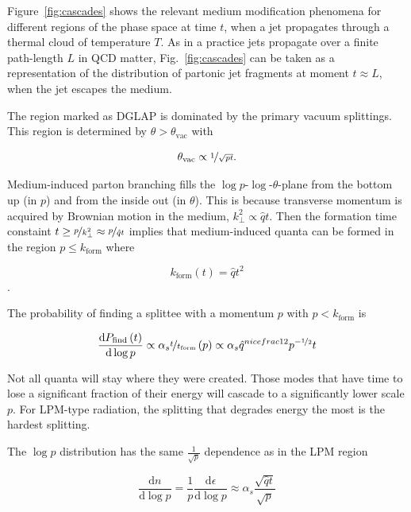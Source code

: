 Figure~\ref{fig:cascades} shows the relevant medium modification phenomena for different regions of the phase space at time $t$, when a jet propagates through a thermal cloud of temperature $T$. As in a practice jets propagate over a finite path-length $L$ in QCD matter, Fig.~\ref{fig:cascades} can be taken as a representation of the distribution of partonic jet fragments at moment $t \approx L$, when the jet escapes the medium.

The region marked as DGLAP is dominated by the primary vacuum splittings. This region is determined by $\theta > \theta_\mathrm{vac}$ with

\begin{equation}
\theta_\mathrm{vac} \propto \nicefrac{1}{\sqrt{pt}}.
\end{equation}


Medium-induced parton branching fills the $\log p$-$\log$-$\theta$-plane from the bottom up (in $p$) and from the inside out (in $\theta$). This is because transverse momentum is acquired by Brownian motion in the medium, $k_\perp^2 \propto \hat q t$. Then the formation time constaint $t \geq \nicefrac{p}{k_\perp^2} \approx \nicefrac{p}{\hat q t}$ implies that medium-induced quanta can be formed in the region $p \leq k_\mathrm{form}$ where

$$k_\mathrm{form}\left(t\right) = \hat q t^2$$.

The probability of finding a splittee with a momentum $p$ with $p < k_\mathrm{form}$ is 

\begin{equation}
\frac{\mathrm d P_\mathrm{find}\left(t\right)}{\mathrm d \log p} \propto \alpha_s \nicefrac{t}{t_\mathrm{form}}\left(p\right) \propto \alpha_s \hat q ^{nicefrac{1}{2}} p^{-\nicefrac{1}{2}} t
\end{equation} 

Not all quanta will stay where they were created. Those modes that have time to lose a significant fraction of their energy will cascade to a significantly lower scale $p$. For LPM-type radiation, the splitting that degrades energy the most is the hardest splitting. 

The $\log p $ distribution has the same $\frac{1}{\sqrt{p}}$ dependence as in the LPM region

\begin{equation}
\frac{\mathrm{d}n}{\mathrm{d}\log p} = \frac{1}{p}\frac{\mathrm{d}\epsilon}{\mathrm{d}\log p} \approx \alpha_s \frac{\sqrt{\hat q t}}{\sqrt{p}}
\end{equation}

